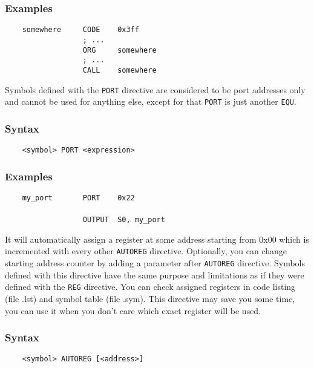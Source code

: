     \subsubsection{Examples}
        \verb'    somewhere     CODE    0x3ff'\\
        \verb'                  ; ...'\\
        \verb'                  ORG     somewhere'\\
        \verb'                  ; ...'\\
        \verb'                  CALL    somewhere'

    Symbols defined with the \texttt{PORT} directive are considered to be port addresses only and cannot be used for anything else, except for that \texttt{PORT} is just another \texttt{EQU}.

    \subsubsection{Syntax}
        \verb'    <symbol> PORT <expression>'

    \subsubsection{Examples}
        \verb'    my_port       PORT    0x22'\\
        \verb''\\
        \verb'                  OUTPUT  S0, my_port'

    It will automatically assign a register at some address starting from 0x00 which is incremented with every other \texttt{AUTOREG} directive. Optionally, you can change starting address counter by adding a parameter after \texttt{AUTOREG} directive. Symbols defined with this directive have the same purpose and limitations as if they were defined with the \texttt{REG} directive. You can check assigned registers in code listing (file .lst) and symbol table (file .sym). This directive may save you some time, you can use it when you don't care which exact register will be used.

    \subsubsection{Syntax}
        \verb'    <symbol> AUTOREG [<address>]'

